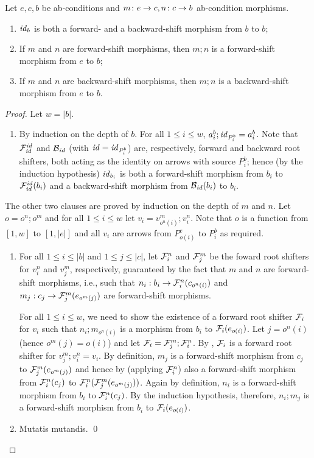 \begin{lemma}
Let $e,c,b$ be ab-conditions and $m\colon e\rightarrow c, n\colon c\rightarrow b$ ab-condition morphisms.
\begin{enumerate}[topsep=\smallskipamount]
\item $\mathit{id}_b$ is both a forward- and a backward-shift morphism from $b$ to $b$;
\item If $m$ and $n$ are forward-shift morphisms, then $m;n$ is a forward-shift morphism from $e$ to $b$;
\item If $m$ and $n$ are backward-shift morphisms, then $m;n$ is a backward-shift morphism from $e$ to $b$.
\end{enumerate}
\end{lemma}
%
\begin{fullorname}
\begin{proof}
Let $w=|b|$.
%
\begin{enumerate}[topsep=\smallskipamount]
\item By induction on the depth of $b$. For all $1\leq i\leq w$, $a^b_i;\mathit{id}_{P^b_i}=a^b_i$. Note that $\mathcal{F}^{\mathit{id}}_{\mathit{id}}$ and $\mathcal{B}_{\mathit{id}}$ (with $\mathit{id}=\mathit{id}_{P^b_i}$) are, respectively, forward and backward root shifters, both acting as the identity on arrows with source $P^b_i$; hence (by the induction hypothesis) $\mathit{id}_{b_i}$ is both a forward-shift morphism from $b_i$ to $\mathcal{F}^{\mathit{id}}_{\mathit{id}}(b_i)$ and a backward-shift morphism from  $\mathcal{B}_{\mathit{id}}(b_i)$ to $b_i$.
\end{enumerate}
%
The other two clauses are proved by induction on the depth of $m$ and $n$. Let $o=o^n;o^m$ and for all $1\leq i\leq w$ let $v_i=v^m_{o^n(i)};v^n_i$. Note that $o$ is a function from $[1,w]$ to $[1,|e|]$ and all $v_i$ are arrows from $P^e_{o(i)}$ to $P^b_i$ as required.
%
\begin{enumerate}[resume]
\item For all $1\leq i\leq |b|$ and $1\leq j\leq |c|$, let $\mathcal{F}^n_i$ and $\mathcal{F}^m_j$ be the foward root shifters for $v^n_i$ and $v^m_j$, respectively, guaranteed by the fact that $m$ and $n$ are forward-shift morphisms, i.e., such that $n_i:b_i \rightarrow \mathcal{F}^n_i(c_{o^n(i)})$ and $m_j:c_j \rightarrow \mathcal{F}^m_j(e_{o^m(j)})$ are forward-shift morphisms.

\smallskip
For all $1\leq i\leq w$, we need to show the existence of a forward root shifter $\mathcal{F}_i$ for $v_i$ such that $n_i;m_{o^n(i)}$ is a morphism from $b_i$ to $\mathcal{F}_i(e_{o(i)})$. Let $j=o^n(i)$ (hence $o^m(j)=o(i)$) and let $\mathcal{F}_i=\mathcal{F}^m_j;\mathcal{F}^n_i$. By , $\mathcal{F}_i$ is a forward root shifter for $v^m_j;v^n_i=v_i$. By definition, $m_j$ is a forward-shift morphism from $c_j$ to $\mathcal{F}^m_j(e_{o^m(j)})$ and hence by  (applying $\mathcal{F}^n_i$) also a forward-shift morphism from $\mathcal{F}^n_i(c_j)$ to $\mathcal{F}^n_i(\mathcal{F}^m_j(e_{o^m(j)}))$. Again by definition, $n_i$ is a forward-shift morphism from $b_i$ to $\mathcal{F}^n_i(c_j)$. By the induction hypothesis, therefore, $n_i;m_j$ is a forward-shift morphism from  $b_i$ to $\mathcal{F}_i(e_{o(i)})$.

\item Mutatis mutandis.
\qed
\end{enumerate}
\end{proof}
\end{fullorname}
